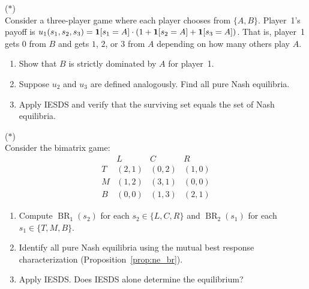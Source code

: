 \documentclass[11pt,a4paper]{article}
\DeclareMathOperator{\BR}{BR}
\begin{document}
\begin{exercise}
\label{ex:three_player}
\textnormal{(\(*\))} \\
Consider a three-player game where each player chooses from $\{A, B\}$.
Player~1's payoff is $u_1(s_1, s_2, s_3) = \mathbf{1}[s_1 = A] \cdot
(1 + \mathbf{1}[s_2 = A] + \mathbf{1}[s_3 = A])$.  That is, player~1
gets $0$ from $B$ and gets $1$, $2$, or $3$ from $A$ depending on how
many others play $A$.
\begin{enumerate}[label=(\alph*)]
    \item Show that $B$ is strictly dominated by $A$ for player~1.
    \item Suppose $u_2$ and $u_3$ are defined analogously.  Find all pure
    Nash equilibria.
    \item Apply IESDS and verify that the surviving set equals the set of
    Nash equilibria.
\end{enumerate}
\end{exercise}

\begin{exercise}
\label{ex:br_analysis}
\textnormal{(\(*\))} \\
Consider the bimatrix game:
\[
\begin{array}{c|ccc}
    & L & C & R \\ \hline
  T & (2,1) & (0,2) & (1,0) \\
  M & (1,2) & (3,1) & (0,0) \\
  B & (0,0) & (1,3) & (2,1)
\end{array}
\]
\begin{enumerate}[label=(\alph*)]
    \item Compute $\BR_1(s_2)$ for each $s_2 \in \{L, C, R\}$ and
    $\BR_2(s_1)$ for each $s_1 \in \{T, M, B\}$.
    \item Identify all pure Nash equilibria using the mutual best response
    characterization (Proposition~\ref{prop:ne_br}).
    \item Apply IESDS.  Does IESDS alone determine the equilibrium?
\end{enumerate}
\end{exercise}
\end{document}
